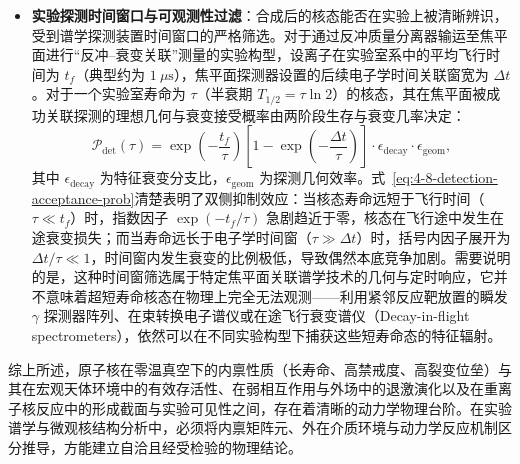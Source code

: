\begin{itemize}
\begin{equation}
b_{\mathrm{eff}} \equiv \frac{\sum_{J_0} \sigma_{\mathrm{ER}}(E, J_0) \bar{b}_{\mathrm{feed}}(E, J_0)}{\sum_{J_0} \sigma_{\mathrm{ER}}(E, J_0)}
\end{equation}
严格是全分波剩余核产生截面加权的系综平均值（分母要求总剩余截面非零）。若反应进入通道角动量输入偏低，使得进入态系综的自旋分布无法有效重叠到高自旋异能态的侧线馈入带上，大部分级联流将旁路流向低自旋基态，使得该异能态的有效截面受到严重抑制。
\item \textbf{实验探测时间窗口与可观测性过滤}：合成后的核态能否在实验上被清晰辨识，受到谱学探测装置时间窗口的严格筛选。对于通过反冲质量分离器输运至焦平面进行“反冲--衰变关联”测量的实验构型，设离子在实验室系中的平均飞行时间为 $t_f$（典型约为 $1\ \mu\mathrm{s}$），焦平面探测器设置的后续电子学时间关联窗宽为 $\Delta t$。对于一个实验室寿命为 $\tau$（半衰期 $T_{1/2} = \tau \ln 2$）的核态，其在焦平面被成功关联探测的理想几何与衰变接受概率由两阶段生存与衰变几率决定：
\begin{equation}\label{eq:4-8-detection-acceptance-prob}
\mathcal{P}_{\mathrm{det}}(\tau) = \exp\left(-\frac{t_f}{\tau}\right) \left[ 1 - \exp\left(-\frac{\Delta t}{\tau}\right) \right] \cdot \epsilon_{\mathrm{decay}} \cdot \epsilon_{\mathrm{geom}},
\end{equation}
其中 $\epsilon_{\mathrm{decay}}$ 为特征衰变分支比，$\epsilon_{\mathrm{geom}}$ 为探测几何效率。式~\eqref{eq:4-8-detection-acceptance-prob}清楚表明了双侧抑制效应：当核态寿命远短于飞行时间（$\tau \ll t_f$）时，指数因子 $\exp(-t_f/\tau)$ 急剧趋近于零，核态在飞行途中发生在途衰变损失；而当寿命远长于电子学时间窗（$\tau \gg \Delta t$）时，括号内因子展开为 $\Delta t / \tau \ll 1$，时间窗内发生衰变的比例极低，导致偶然本底竞争加剧。需要说明的是，这种时间窗筛选属于特定焦平面关联谱学技术的几何与定时响应，它并不意味着超短寿命核态在物理上完全无法观测——利用紧邻反应靶放置的瞬发 $\gamma$ 探测器阵列、在束转换电子谱仪或在途飞行衰变谱仪（Decay-in-flight spectrometers），依然可以在不同实验构型下捕获这些短寿命态的特征辐射。
\end{itemize}

综上所述，原子核在零温真空下的内禀性质（长寿命、高禁戒度、高裂变位垒）与其在宏观天体环境中的有效存活性、在弱相互作用与外场中的退激演化以及在重离子核反应中的形成截面与实验可见性之间，存在着清晰的动力学物理台阶。在实验谱学与微观核结构分析中，必须将内禀矩阵元、外在介质环境与动力学反应机制区分推导，方能建立自洽且经受检验的物理结论。

